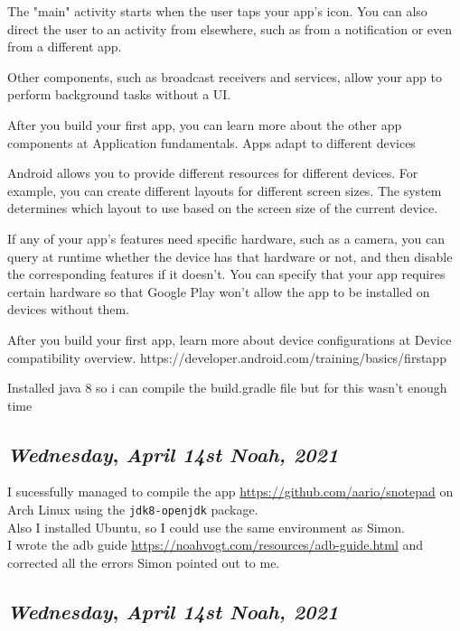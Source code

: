 The "main" activity starts when the user taps your app's icon. You can also direct the user to an activity from elsewhere, such as from a notification or even from a different app.

Other components, such as broadcast receivers and services, allow your app to perform background tasks without a UI.

After you build your first app, you can learn more about the other app components at Application fundamentals.
Apps adapt to different devices

Android allows you to provide different resources for different devices. For example, you can create different layouts for different screen sizes. The system determines which layout to use based on the screen size of the current device.

If any of your app's features need specific hardware, such as a camera, you can query at runtime whether the device has that hardware or not, and then disable the corresponding features if it doesn't. You can specify that your app requires certain hardware so that Google Play won't allow the app to be installed on devices without them.

After you build your first app, learn more about device configurations at Device compatibility overview. 
https://developer.android.com/training/basics/firstapp

Installed java 8 so i can compile the build.gradle file but for this wasn't enough time


\def\day{\textit{April 14st Noah, 2021}}
\def\weekday{\textit{Wednesday}}
\subsection*{\weekday, \day}

I sucessfully managed to compile the app \url{https://github.com/aario/snotepad} on Arch Linux using the \texttt{jdk8-openjdk} package.\\

Also I installed Ubuntu, so I could use the same environment as Simon.\\

I wrote the adb guide \url{https://noahvogt.com/resources/adb-guide.html} and corrected all the errors Simon pointed out to me.

\def\day{\textit{April 14st Noah, 2021}}
\def\weekday{\textit{Wednesday}}
\subsection*{\weekday, \day}


